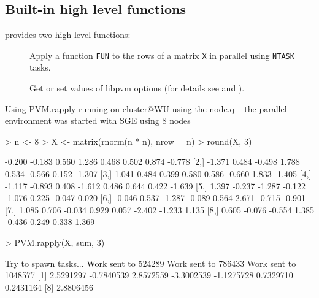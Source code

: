 \subsection{Built-in high level functions}

 provides two high level functions: 

\begin{description}
\item[] Apply a function
  \texttt{FUN} to the rows of a matrix \texttt{X} in
  parallel using \texttt{NTASK} tasks.
\item[] Get or set values of libpvm
  options (for details see \cite{nali07rpvm} and \cite{geist94pvm}).
\end{description}

\begin{Example} Using PVM.rapply\newline
running on cluster@WU using the node.q -- the parallel environment was
started with SGE using 8 nodes

\begin{Schunk}
\begin{Sinput}
> n <- 8
> X <- matrix(rnorm(n * n), nrow = n)
> round(X, 3)
\end{Sinput}
\begin{Soutput}
       [,1]   [,2]   [,3]   [,4]   [,5]   [,6]   [,7]   [,8]
[1,] -0.200 -0.183  0.560  1.286  0.468  0.502  0.874 -0.778
[2,] -1.371  0.484 -0.498  1.788  0.534 -0.566  0.152 -1.307
[3,]  1.041  0.484  0.399  0.580  0.586 -0.660  1.833 -1.405
[4,] -1.117 -0.893  0.408 -1.612  0.486  0.644  0.422 -1.639
[5,]  1.397 -0.237 -1.287 -0.122 -1.076  0.225 -0.047  0.020
[6,] -0.046  0.537 -1.287 -0.089  0.564  2.671 -0.715 -0.901
[7,]  1.085  0.706 -0.034  0.929  0.057 -2.402 -1.233  1.135
[8,]  0.605 -0.076 -0.554  1.385 -0.436  0.249  0.338  1.369
\end{Soutput}
\begin{Sinput}
> PVM.rapply(X, sum, 3)
\end{Sinput}
\begin{Soutput}
Try to spawn tasks...
Work sent to  524289 
Work sent to  786433 
Work sent to  1048577 
[1]  2.5291297 -0.7840539  2.8572559 -3.3002539 -1.1275728  0.7329710  0.2431164
[8]  2.8806456
\end{Soutput}
\end{Schunk}
\label{ex:rpvm-rapply}
\end{Example}


